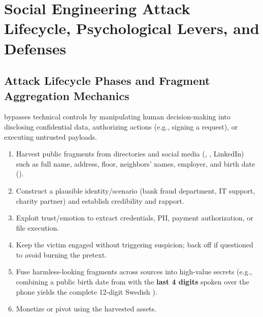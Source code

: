 \section{Social Engineering Attack Lifecycle, Psychological Levers, and Defenses}

\subsection{Attack Lifecycle Phases and Fragment Aggregation Mechanics}
 bypasses technical controls by manipulating human decision-making into disclosing confidential data, authorizing actions (e.g., signing a  request), or executing untrusted payloads.
\begin{compactitem}
  \item {}
  \begin{enumerate}[label=(\arabic*), leftmargin=1.8em]
    \item {} Harvest public fragments from directories and social media (, , LinkedIn) such as full name, address, floor, neighbors' names, employer, and birth date ().
    \item {} Construct a plausible identity/scenario (bank fraud department, IT support, charity partner) and establish credibility and rapport.
    \item {} Exploit trust/emotion to extract credentials, PII, payment authorization, or file execution.
    \item {} Keep the victim engaged without triggering suspicion; back off if questioned to avoid burning the pretext.
    \item {} Fuse harmless-looking fragments across sources into high-value secrets (e.g., combining a public birth date  from  with the \textbf{last 4 digits} spoken over the phone yields the complete 12-digit Swedish  ).
    \item {} Monetize or pivot using the harvested assets.
  \end{enumerate}
\end{compactitem}

